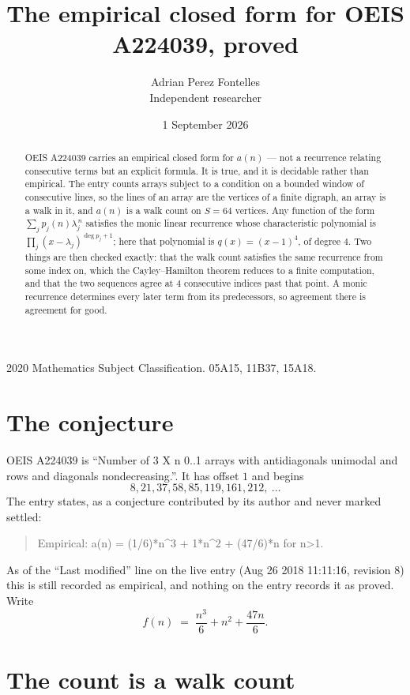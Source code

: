 \documentclass[11pt,a4paper]{article}
\title{The empirical closed form for OEIS A224039, proved}
\author{Adrian Perez Fontelles\\ \small Independent researcher}
\date{1 September 2026}
\theoremstyle{plain}
\theoremstyle{definition}
\begin{document}
\maketitle

\begin{abstract}
OEIS A224039 carries an empirical closed form for $a(n)$ --- not a recurrence relating
consecutive terms but an explicit formula. It is true, and it is decidable rather than
empirical. The entry counts arrays subject to a condition on a bounded window of consecutive lines, so the lines of an array are the
vertices of a finite digraph, an array is a walk in it, and $a(n)$ is a walk count on
$S=64$ vertices. Any function of the form $\sum_j p_j(n)\lambda_j^{\,n}$ satisfies the
monic linear recurrence whose characteristic polynomial is
$\prod_j(x-\lambda_j)^{\deg p_j+1}$; here that polynomial is $q(x)=(x-1)^{4}$, of degree
$4$. Two things are then checked exactly: that the walk count satisfies the same
recurrence from some index on, which the Cayley--Hamilton theorem reduces to a finite
computation, and that the two sequences agree at $4$ consecutive indices past that
point. A monic recurrence determines every later term from its predecessors, so agreement
there is agreement for good.
\end{abstract}

\noindent\small 2020 Mathematics Subject Classification. 05A15, 11B37, 15A18.\normalsize

\section{The conjecture}

OEIS A224039 is ``Number of 3 X n 0..1 arrays with antidiagonals unimodal and rows and diagonals nondecreasing.''. It has offset $1$ and begins
\[
8, 21, 37, 58, 85, 119, 161, 212,\ \dots
\]
The entry states, as a conjecture contributed by its author and never marked settled:
\begin{quote}
Empirical: a(n) = (1/6)*n\^{}3 + 1*n\^{}2 + (47/6)*n for n>1.
\end{quote}
As of the ``Last modified'' line on the live entry (Aug 26 2018 11:11:16, revision 8) this is still
recorded as empirical, and nothing on the entry records it as proved. Write
\[
f(n)\;=\;\frac{n^{3}}{6} + n^{2} + \frac{47 n}{6}.
\]

\section{The count is a walk count}
\end{document}
